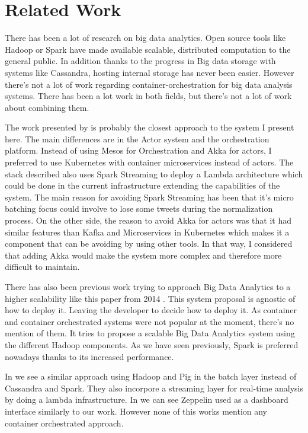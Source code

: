 
\chapter{Related Work} %

\label{Chapter8} %

There has been a lot of research on big data analytics. Open source tools like Hadoop or Spark have made available scalable, distributed computation to the general public. In addition thanks to the progress in Big data storage with systems like Cassandra, hosting internal storage has never been easier. However there’s not a lot of work regarding container-orchestration for big data analysis systems. There has been a lot work in both fields, but there’s not a lot of work about combining them.

The work presented by \parencite{smack} is probably the closest approach to the system I present here. The main differences are in the Actor system and the orchestration platform. Instead of using Mesos for Orchestration and Akka for actors, I preferred to use Kubernetes with container microservices instead of actors. The stack described also uses Spark Streaming to deploy a Lambda architecture which could be done in the current infrastructure extending the capabilities of the system. The main reason for avoiding Spark Streaming has been that it’s micro batching focus could involve to lose some tweets during the normalization process. On the other side, the reason to avoid Akka for actors was that it had similar features than Kafka and Microservices in Kubernetes which makes it a component that can be avoiding by using other tools. In that way, I considered that adding Akka would make the system more complex and therefore more difficult to maintain. 

There has also been previous work trying to approach Big Data Analytics to a higher scalability like this paper from 2014 \parencite{scalableHadoop}. This system proposal is agnostic of how to deploy it. Leaving the developer to decide how to deploy it. As container and container orchestrated systems were not popular at the moment, there’s no mention of them. It tries to propose a scalable Big Data Analytics system using the different Hadoop components. As we have seen previously, Spark is preferred nowadays thanks to its increased performance.

In \parencite{lambda2014} we see a similar approach using Hadoop and Pig in the batch layer instead of Cassandra and Spark. They also incorpore a streaming layer for real-time analysis by doing a lambda infrastructure. In \parencite{streamingAnalysis} we can see Zeppelin used as a dashboard interface similarly to our work. However none of this works mention any container orchestrated approach.
